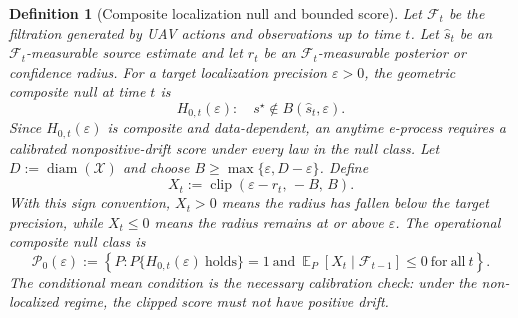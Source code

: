 \documentclass[11pt]{article}
\newtheorem{definition}[theorem]{Definition}
\DeclareMathOperator{\E}{\mathbb{E}}
\DeclareMathOperator{\diam}{\mathrm{diam}}
\DeclareMathOperator{\clip}{\mathrm{clip}}
\newcommand{\X}{\mathcal{X}}
\newcommand{\wh}{\widehat}
\begin{document}
\begin{definition}[Composite localization null and bounded score]\label{def:composite-localization-null}
Let $\mathcal{F}_t$ be the filtration generated by UAV actions and observations up to time $t$.  Let $\wh{s}_t$ be an $\mathcal{F}_t$-measurable source estimate and let $r_t$ be an $\mathcal{F}_t$-measurable posterior or confidence radius.  For a target localization precision $\varepsilon>0$, the geometric composite null at time $t$ is
\[
        H_{0,t}(\varepsilon):
        \quad
        s^\star\notin B(\wh{s}_t,\varepsilon).
\]
Since $H_{0,t}(\varepsilon)$ is composite and data-dependent, an anytime e-process requires a calibrated nonpositive-drift score under every law in the null class.  Let $D:=\diam(\X)$ and choose $B\geq\max\{\varepsilon,D-\varepsilon\}$.  Define
\begin{equation}
        X_t
        :=
        \clip(\varepsilon-r_t,\,-B,\,B).
        \label{eq:bounded-localization-score}
\end{equation}
With this sign convention, $X_t>0$ means the radius has fallen below the target precision, while $X_t\leq0$ means the radius remains at or above $\varepsilon$.  The operational composite null class is
\begin{equation}
        \mathcal{P}_0(\varepsilon)
        :=
        \left\{
        P:
        P\{H_{0,t}(\varepsilon)\ \mathrm{holds}\}=1
        \ \mathrm{and}\
        \E_P[X_t\mid\mathcal{F}_{t-1}]\leq0
        \ \mathrm{for\ all}\ t
        \right\}.
        \label{eq:operational-null-class}
\end{equation}
The conditional mean condition is the necessary calibration check: under the non-localized regime, the clipped score must not have positive drift.
\end{definition}
\end{document}
